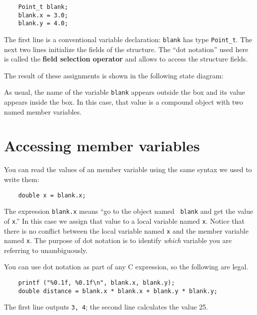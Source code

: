 \begin{verbatim}
	Point_t blank;
	blank.x = 3.0;
	blank.y = 4.0;   
\end{verbatim}
%
The first line is a conventional variable declaration: {\tt blank} has
type {\tt Point\_t}.  The next two lines initialize the fields of the
structure.  The ``dot notation'' used here is called the {\bf field selection
	operator} and allows to access the structure fields.


The result of these assignments is shown in the following
state diagram:

\vspace{0.1in}
\centerline{}
\vspace{0.1in}

As usual, the name of the variable {\tt blank} appears outside the box
and its value appears inside the box.  In this case, that value is
a compound object with two named member variables.

\section{Accessing member variables}

You can read the values of an member variable using the same syntax we
used to write them:

\begin{verbatim}
	double x = blank.x;
\end{verbatim}
%
The expression {\tt blank.x} means ``go to the object named {\tt
	blank} and get the value of {\tt x}.''  In this case we assign that
value to a local variable named {\tt x}.  Notice that there is no
conflict between the local variable named {\tt x} and the member
variable named {\tt x}.  The purpose of dot notation is to identify
{\em which} variable you are referring to unambiguously.

You can use dot notation as part of any C expression, so the
following are legal.

\begin{verbatim}
	printf ("%0.1f, %0.1f\n", blank.x, blank.y);
	double distance = blank.x * blank.x + blank.y * blank.y;
\end{verbatim}
%
The first line outputs {\tt 3, 4}; the second line calculates
the value 25.

